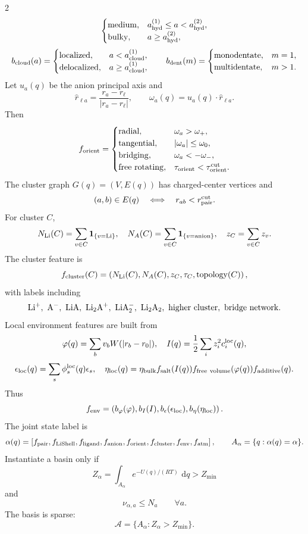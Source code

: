 \documentclass[10pt]{article}
\newcommand{\dd}{\,\mathrm d}
\begin{document}
\begin{multicols}{2}
\[\begin{cases}
{\rm medium}, & a_{\rm hyd}^{(1)}\le a<a_{\rm hyd}^{(2)},\\
{\rm bulky}, & a\ge a_{\rm hyd}^{(2)},
\end{cases}
\]
\[
b_{\rm cloud}(a)=
\begin{cases}
{\rm localized}, & a<a_{\rm cloud}^{(1)},\\
{\rm delocalized}, & a\ge a_{\rm cloud}^{(1)},
\end{cases}
\qquad
b_{\rm dent}(m)=
\begin{cases}
{\rm monodentate}, & m=1,\\
{\rm multidentate}, & m>1.
\end{cases}
\]
Let \(u_a(q)\) be the anion principal axis and
\[
\hat r_{\ell a}=\frac{r_a-r_\ell}{|r_a-r_\ell|},
\qquad
\omega_a(q)=u_a(q)\cdot\hat r_{\ell a}.
\]
Then
\[
f_{\rm orient}=
\begin{cases}
{\rm radial}, & \omega_a>\omega_+,\\
{\rm tangential}, & |\omega_a|\le\omega_0,\\
{\rm bridging}, & \omega_a<-\omega_-,\\
{\rm free\ rotating}, & \tau_{\rm orient}<\tau_{\rm orient}^{\rm cut}.
\end{cases}
\]
The cluster graph \(G(q)=(V,E(q))\) has charged-center vertices and
\[
(a,b)\in E(q)\quad\Longleftrightarrow\quad r_{ab}<r_{\rm pair}^{\rm cut}.
\]
For cluster \(C\),
\[
N_{\rm Li}(C)=\sum_{v\in C}\mathbf 1_{\{v={\rm Li}\}},
\quad
N_A(C)=\sum_{v\in C}\mathbf 1_{\{v={\rm anion}\}},
\quad
z_C=\sum_{v\in C}z_v.
\]
The cluster feature is
\[
f_{\rm cluster}(C)=
\left(N_{\rm Li}(C),N_A(C),z_C,\tau_C,\operatorname{topology}(C)\right),
\]
with labels including
\[
{\rm Li^+},\ {\rm A^-},\ {\rm LiA},\ {\rm Li_2A^+},\
{\rm LiA_2^-},\ {\rm Li_2A_2},\
{\rm higher\ cluster},\ {\rm bridge\ network}.
\]
Local environment features are built from
\[
\varphi(q)=\sum_b v_bW(|r_b-r_0|),
\quad
I(q)=\frac12\sum_i z_i^2c_i^{\rm loc}(q),
\]
\[
\epsilon_{\rm loc}(q)=\sum_s\phi_s^{\rm loc}(q)\epsilon_s,
\quad
\eta_{\rm loc}(q)=
\eta_{\rm bulk}
f_{\rm salt}(I(q))
f_{\rm free\ volume}(\varphi(q))
f_{\rm additive}(q).
\]
Thus
\[
f_{\rm env}=
\left(
b_\varphi(\varphi),b_I(I),b_\epsilon(\epsilon_{\rm loc}),
b_\eta(\eta_{\rm loc})
\right).
\]
The joint state label is
\[
\alpha(q)=
\left[
f_{\rm pair},
f_{\rm LiShell},
f_{\rm ligand},
f_{\rm anion},
f_{\rm orient},
f_{\rm cluster},
f_{\rm env},
f_{\rm atm}
\right],
\qquad
A_\alpha=\{q:\alpha(q)=\alpha\}.
\]
Instantiate a basin only if
\[
Z_\alpha=
\int_{A_\alpha}e^{-U(q)/(RT)}\,\dd q>Z_{\min}
\]
and
\[
\nu_{\alpha,a}\le N_a
\qquad\forall a.
\]
The basis is sparse:
\[
\mathcal A=\{A_\alpha:Z_\alpha>Z_{\min}\}.
\]


\end{multicols}
\end{document}

